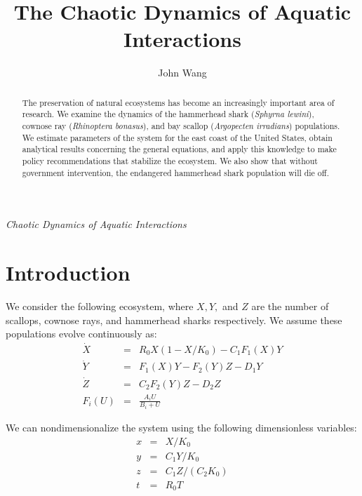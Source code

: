 \documentclass[12pt,journal,compsoc,twoside]{IEEEtran}
\begin{document}
\title{The Chaotic Dynamics of Aquatic Interactions}
\author{John Wang}

%
{\textit{Chaotic Dynamics of Aquatic Interactions}}


\maketitle

\begin{abstract}
The preservation of natural ecosystems has become an increasingly important area of research. We examine the dynamics of the hammerhead shark (\textit{Sphyrna lewini}), cownose ray (\textit{Rhinoptera bonasus}), and bay scallop (\textit{Argopecten irradians}) populations. We estimate parameters of the system for the east coast of the United States, obtain analytical results concerning the general equations, and apply this knowledge to make policy recommendations that stabilize the ecosystem. We also show that without government intervention, the endangered hammerhead shark population will die off. 
\end{abstract}

\section{Introduction}

We consider the following ecosystem, where $X,Y,$ and $Z$ are the number of scallops, cownose rays, and hammerhead sharks respectively. We assume these populations evolve continuously as:
\begin{eqnarray}
\dot{X} &=& R_0 X(1 - X/K_0) - C_1 F_1(X) Y \nonumber \\
\dot{Y} &=& F_1 (X) Y - F_2 (Y) Z - D_1 Y \\
\dot{Z} &=& C_2 F_2(Y) Z - D_2 Z \nonumber \\
 F_i(U) &=& \frac{A_i U}{B_i + U} \nonumber
\end{eqnarray}

We can nondimensionalize the system using the following dimensionless variables:
\begin{eqnarray}
x &=& X/K_0 \nonumber \\
y &=& C_1 Y/ K_0 \nonumber \\
z &=& C_1 Z / (C_2 K_0) \\
t &=& R_0 T \nonumber
\end{eqnarray}
\end{document}
